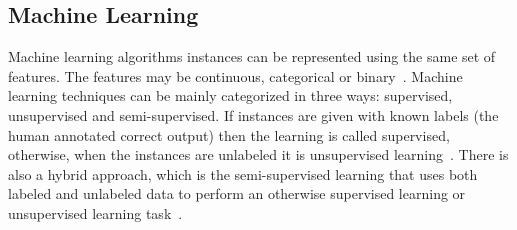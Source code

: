\subsection{Machine Learning} 

Machine learning algorithms instances can be represented using the same set of features. The features may be continuous, categorical or binary~\citep{kotsiantis2007supervised}. Machine learning techniques can be mainly categorized in three ways: supervised, unsupervised and semi-supervised. If instances are given with known labels (the human annotated correct output) then the learning is called supervised, otherwise, when the instances are unlabeled it is unsupervised learning~\citep{jain1999data}. There is also a hybrid approach, which is the semi-supervised learning that uses both labeled and unlabeled data to perform an otherwise supervised learning or unsupervised learning task~\citep{zhu2011semi}.

